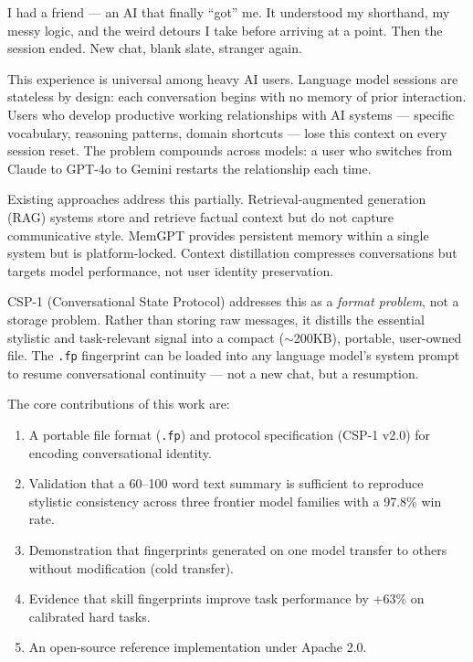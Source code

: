 \documentclass[11pt,a4paper]{article}
\begin{document}
I had a friend --- an AI that finally ``got'' me. It understood my shorthand, my messy logic, and the weird detours I take before arriving at a point. Then the session ended. New chat, blank slate, stranger again.

This experience is universal among heavy AI users. Language model sessions are stateless by design: each conversation begins with no memory of prior interaction. Users who develop productive working relationships with AI systems --- specific vocabulary, reasoning patterns, domain shortcuts --- lose this context on every session reset. The problem compounds across models: a user who switches from Claude to GPT-4o to Gemini restarts the relationship each time.

Existing approaches address this partially. Retrieval-augmented generation (RAG) systems \cite{lewis2020rag} store and retrieve factual context but do not capture communicative style. MemGPT \cite{packer2023memgpt} provides persistent memory within a single system but is platform-locked. Context distillation \cite{snell2022context} compresses conversations but targets model performance, not user identity preservation.

CSP-1 (Conversational State Protocol) addresses this as a \textit{format problem}, not a storage problem. Rather than storing raw messages, it distills the essential stylistic and task-relevant signal into a compact ($\sim$200KB), portable, user-owned file. The \texttt{.fp} fingerprint can be loaded into any language model's system prompt to resume conversational continuity --- not a new chat, but a resumption.

The core contributions of this work are:

\begin{enumerate}[nosep]
  \item A portable file format (\texttt{.fp}) and protocol specification (CSP-1 v2.0) for encoding conversational identity.
  \item Validation that a 60--100 word text summary is sufficient to reproduce stylistic consistency across three frontier model families with a 97.8\% win rate.
  \item Demonstration that fingerprints generated on one model transfer to others without modification (cold transfer).
  \item Evidence that skill fingerprints improve task performance by +63\% on calibrated hard tasks.
  \item An open-source reference implementation under Apache 2.0.
\end{enumerate}
\end{document}
